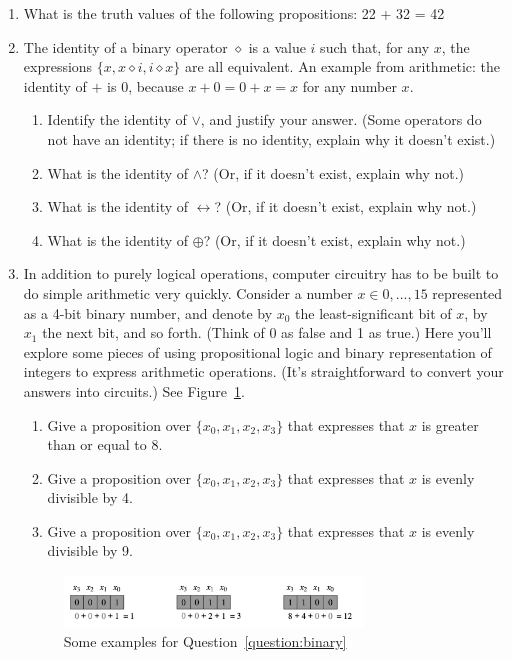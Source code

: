 \documentclass[11pt, oneside]{article}   	%
\begin{document}
\begin{enumerate}
\item What is the truth values of the following propositions: 22 + 32 = 42
\item The identity of a binary operator $\diamond$ is a value $i$ such that, for any $x$, the expressions $\{x,x⋄i,i⋄x\}$ are all equivalent.
An example from arithmetic: 
the identity of $+$ is $0$, because $x + 0 = 0 + x = x$ for any number $x$. 
\begin{enumerate}
\item Identify the identity of $\vee$, and justify your answer. (Some operators do not have an identity; if there is no identity, explain why it doesn’t exist.)
\item What is the identity of $\wedge$? (Or, if it doesn’t exist, explain why not.)
\item What is the identity of $\leftrightarrow$? (Or, if it doesn’t exist, explain why not.)
\item What is the identity of $\oplus$? (Or, if it doesn’t exist, explain why not.)
\end{enumerate}
\item \label{question:binary}
In addition to purely logical operations, computer circuitry has to be built to do simple arithmetic very quickly. 
Consider a number $x \in {0, . . . , 15}$ represented as a 4-bit binary number, 
and denote by $x_0$ the least-significant bit of $x$, by $x_1$ the next bit, and so forth. 
(Think of 0 as false and 1 as true.) 
Here you’ll explore some pieces of using propositional logic and binary representation of integers to express arithmetic operations. 
(It’s straightforward to convert your answers into circuits.) 
See Figure~\ref{fig:binary}.
\begin{enumerate}
\item Give a proposition over $\{x_0 , x_1 , x_2 , x_3 \}$ that expresses that $x$ is greater than or equal to 8.
\item Give a proposition over $\{x_0 , x_1 , x_2 , x_3 \}$ that expresses that $x$ is evenly divisible by 4.
\item Give a proposition over $\{x_0 , x_1 , x_2 , x_3 \}$ that expresses that $x$ is evenly divisible by 9.
\end{enumerate}
\begin{figure}
\centering
\includegraphics[width=0.75\textwidth]{small_binary}
\caption{Some examples for Question~\ref{question:binary}}
\label{fig:binary}
\end{figure}

\end{enumerate}
\end{document}
